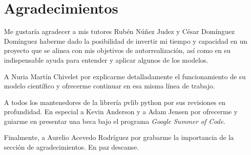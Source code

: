 \chapter*{Agradecimientos} \label{chp:agrad}

Me gustaría agradecer a mis tutores Rubén Núñez Judez y César Domínguez Domínguez haberme dado la posibilidad de invertir mi tiempo y capacidad en un proyecto que se alinea con mis objetivos de autorrealización, así como en su indispensable ayuda para entender y aplicar algunos de los modelos.

A Nuria Martín Chivelet por explicarme detalladamente el funcionamiento de su modelo científico y ofrecerme continuar en esa misma línea de trabajo.

A todos los mantenedores de la librería pvlib python por sus revisiones en profundidad. En especial a Kevin Anderson y a Adam Jensen por ofrecerme y guiarme en presentar una beca bajo el programa \textit{Google Summer of Code}.

Finalmente, a Aurelio Acevedo Rodríguez por grabarme la importancia de la sección de agradecimientos. En paz descanse.
